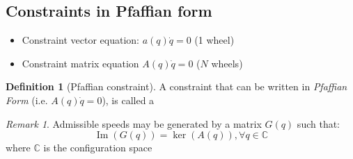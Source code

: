 \documentclass{book}
\DeclareMathOperator{\im}{Im}
\theoremstyle{definition}
\newtheorem{definition}{Definition}[section]
\theoremstyle{remark}
\newtheorem*{remark}{Remark}
\theoremstyle{remark}
\begin{document}
\subsection{Constraints in Pfaffian form}
\begin{itemize}
    \item Constraint vector equation: $a(q)\dot{q}=0$ (1 wheel)
    \item Constraint matrix equation $A(q)\dot{q}=0$ ($N$ wheels)
\end{itemize}
\begin{definition}[Pfaffian constraint]
    A constraint that can be written in \emph{Pfaffian Form} (i.e. $A(q)\dot{q}=0$), is called a 
\end{definition}
\begin{remark}
    Admissible speeds may be generated by a matrix $G(q)$ such that: 
    \[
        \im(G(q))=\ker(A(q)),\forall q \in \mathbb{C}
    \]
    where $\mathbb{C}$ is the configuration space
\end{remark}
\end{document}
